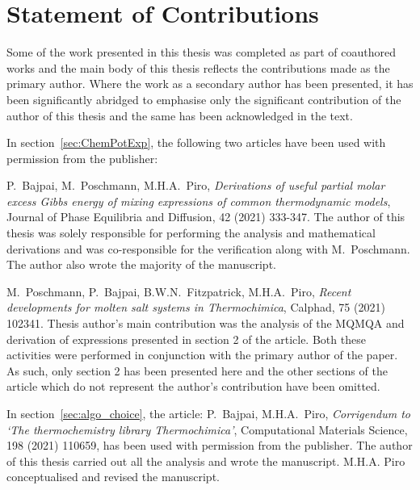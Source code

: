 \chapter*{Statement of Contributions}
Some of the work presented in this thesis was completed as part of coauthored works and the main body of this thesis reflects the contributions made as the primary author. Where the work as a secondary author has been presented, it has been significantly abridged to emphasise only the significant contribution of the author of this thesis and the same has been acknowledged in the text. 

In section~\ref{sec:ChemPotExp}, the following two articles have been used with permission from the publisher:
\begin{enumerate}{\small \compresslist
    \item {P.\ Bajpai}, {M.\ Poschmann}, {M.H.A.\ Piro}, \textit{Derivations of useful partial molar excess Gibbs energy of mixing expressions of common thermodynamic models}, {Journal of Phase Equilibria and Diffusion, 42 (2021) 333-347}. 
The author of this thesis was solely responsible for performing the analysis and mathematical derivations and was co-responsible for the verification along with M.\ Poschmann. The author also wrote the majority of the manuscript. 
    
    \item {M.\ Poschmann}, {P.\ Bajpai}, {B.W.N.\ Fitzpatrick}, {M.H.A.\ Piro}, \textit{Recent developments for molten salt systems in Thermochimica}, {Calphad, 75 (2021) 102341}. 
Thesis author's main contribution was the analysis of the MQMQA and derivation of expressions presented in section 2 of the article. Both these activities were performed in conjunction with the primary author of the paper. As such, only section 2 has been presented here and the other sections of the article which do not represent the author's contribution have been omitted.
   }
\end{enumerate}


In section~\ref{sec:algo_choice}, the article: {P.\ Bajpai}, {M.H.A.\ Piro}, \textit{Corrigendum to `The thermochemistry library Thermochimica'}, {Computational Materials Science, 198 (2021) 110659}, has been used with permission from the publisher. The author of this thesis carried out all the analysis and wrote the manuscript. M.H.A. Piro conceptualised and revised the manuscript.


